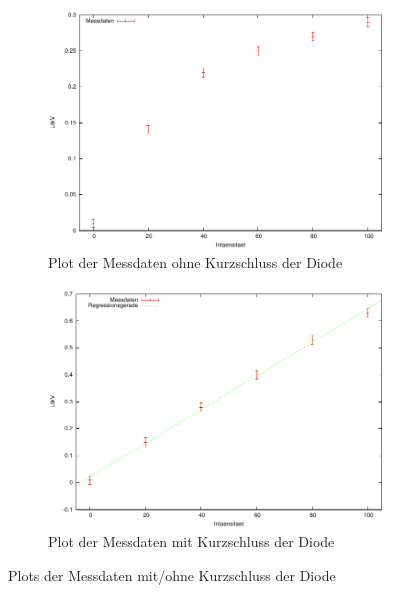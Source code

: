 \documentclass[12pt,a4paper]{article}
\begin{document}
\begin{figure}[H]
        \centering
        \begin{subfigure}[b]{0.48\textwidth}
                \includegraphics[width=\textwidth , scale = 0.4]{a_2_8_a.pdf}
                \caption[Plot der Messdaten ohne Kurzschluss der Diode]{Plot der Messdaten ohne Kurzschluss der Diode}
 				 \label{fig:2_8_a}
        \end{subfigure}%
        \hfill
        \begin{subfigure}[b]{0.48\textwidth}
                \includegraphics[width=\textwidth , scale = 0.4]{a_2_8_b.pdf}
                \caption[Plot der Messdaten mit Kurzschluss der Diode]{Plot der Messdaten mit Kurzschluss der Diode}
  				\label{fig:2_8_b}
        \end{subfigure}
        \caption{Plots der Messdaten mit/ohne Kurzschluss der Diode}
        \label{fig:2_8}
\end{figure}
\end{document}
